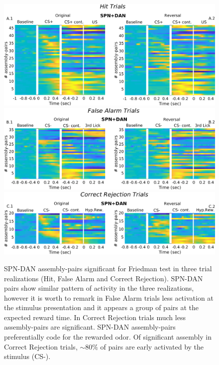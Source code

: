 \begin{figure}
\centering
\includegraphics[scale=0.32]{figures/HeatSPN_DANHit.png}
\includegraphics[scale=0.32]{figures/HeatFA_SPN_DAN1.png}
\includegraphics[scale=0.32]{figures/HeatCR_SPN_DAN1.png}
\caption{SPN-DAN assembly-pairs significant for Friedman test in three trial realizations (Hit, False Alarm and Correct Rejection). SPN-DAN pairs show similar pattern of activity in the three realizations, however it is worth to remark in False Alarm trials less activation at the stimulus presentation and it appears a group of pairs at the expected reward time. In Correct Rejection trials much less assembly-pairs are significant. SPN-DAN assembly-pairs preferentially code for the rewarded odor. Of significant assembly in Correct Rejection trials, $\sim 80\%$ of pairs are early activated by the stimulus (CS-).}
\label{fig:HeatSPN_DANComp}
\end{figure}
